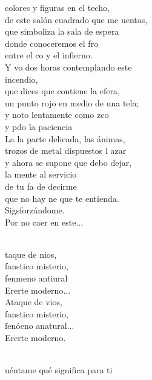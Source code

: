 \begin{cancion}%
	 colores y figuras en el techo,\\
	de este salón cuadrado que me uentas,\\
que simboliza la sala de espera\\
	donde conoceremos el fro \\
	entre el co y el infierno.\\
\jump
	Y vo dos horas contemplando este \\
incendio,\\
	que dices que contiene la efera,\\
un punto rojo en medio de una tela;\\
	y noto lentamente como zco \\
	y pdo la paciencia\\
\jump
	La la parte delicada, las ánimas,\\
	trozos de metal dispuestos l azar\\
y ahora se supone que debo dejar,\\
la mente al servicio\\
	de tu fa de decirme\\
	que no hay ne que te entienda.\\
\jump
	Sigsforzándome.\\
Por no caer en este...\\\jump\\
	\begin{chorus}%
	taque de nios,\\
	fanstico misterio, \\
	fenmeno antiural \\
	Ererte moderno...\\
	Ataque de vios,\\
	fanstico misterio, \\
	fenóeno anatural...\\
	Ererte moderno.\\
	\end{chorus}%
	\jump\\
	uéntame qué significa para ti\\

\end{cancion}
